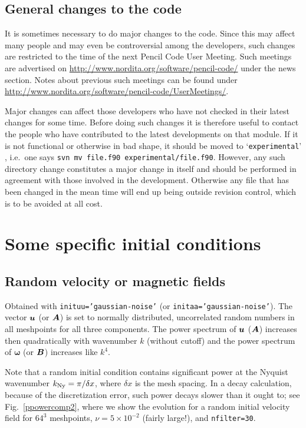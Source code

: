 \documentclass[\mydriver,12pt,twoside,notitlepage,a4paper]{article}
\makeatletter
\newcommand{\code}[1]{\texttt{#1}}
\newcommand{\file}[2][]{%
  \def\index@{#1}%
  `\texttt{#2}'%
  \ifx\index@\@empty\index[file]{#2@\texttt{#2}}%
  \else\index[file]{#1@\texttt{#1}}%
  \fi%
}
\renewcommand{\vec}[1]{\mbox{\boldmath{$#1$}}}
\newcommand{\Av}            {\vec{A}}
\newcommand{\Bv}            {\vec{B}}
\newcommand{\uv}            {\vec{u}}
\newcommand{\omv}           {\boldsymbol{\omega}}
\makeatother
\begin{document}
\subsection{General changes to the code}

It is sometimes necessary to do major changes to the code.
Since this may affect many people and may even be controversial
among the developers, such changes are restricted to the time
of the next Pencil Code User Meeting.
Such meetings are advertised on \url{http://www.nordita.org/software/pencil-code/}
under the news section.
Notes about previous such meetings can be found under
\url{http://www.nordita.org/software/pencil-code/UserMeetings/}.

Major changes can affect those developers who have not checked in
their latest changes for some time.
Before doing such changes it is therefore useful to contact the people
who have contributed to the latest developments on that module.
If it is not functional or otherwise in bad shape, it should be
moved to \file{experimental}, i.e.\ one says
\code{svn mv file.f90 experimental/file.f90}.
However, any such directory change constitutes a major change in
itself and should be performed in agreement with those involved in
the development.
Otherwise any file that has been changed in the mean time will end up
being outside revision control, which is to be avoided at all cost.


\section{Some specific initial conditions}

\subsection{Random velocity or magnetic fields}

Obtained with \code{inituu='gaussian-noise'}
(or \code{initaa='gaussian-noise'}).
The vector $\uv$ (or $\Av$) is set to normally distributed, uncorrelated random
numbers in all meshpoints for all three components.
The power spectrum of
$\uv$ ($\Av$) increases then quadratically with wavenumber $k$ (without cutoff)
and the power spectrum of $\omv$ (or $\Bv$) increases like $k^4$.

Note that a random initial condition contains significant power at the
Nyquist wavenumber $k_{\rm Ny}=\pi/\delta x$, where $\delta x$ is the mesh 
spacing. In a decay calculation, because of the discretization error,
such power decays slower than it ought to; see Fig.~\ref{ppowercomp2},
where we show the evolution for a random initial velocity field for $64^3$
meshpoints, $\nu=5\times10^{-2}$ (fairly large!), and \code{nfilter=30}.
\end{document}
